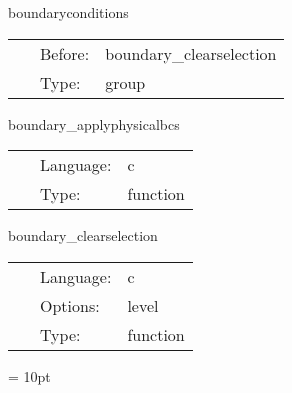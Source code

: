 \documentclass{article}
\begin{document}
\vspace{5mm}


\hspace{5mm} boundaryconditions 

\hspace{5mm}{\it execute all boundary conditions } 


\hspace{5mm}

 \begin{tabular*}{160mm}{cll} 
~ & Before:  & boundary\_clearselection \\ 
~ & Type:  & group \\ 
\end{tabular*} 


\vspace{5mm}


\hspace{5mm} boundary\_applyphysicalbcs 

\hspace{5mm}{\it apply all requested local physical boundary conditions } 


\hspace{5mm}

 \begin{tabular*}{160mm}{cll} 
~ & Language:  & c \\ 
~ & Type:  & function \\ 
\end{tabular*} 


\vspace{5mm}


\hspace{5mm} boundary\_clearselection 

\hspace{5mm}{\it unselect all grid variables for boundary conditions } 


\hspace{5mm}

 \begin{tabular*}{160mm}{cll} 
~ & Language:  & c \\ 
~ & Options:  & level \\ 
~ & Type:  & function \\ 
\end{tabular*} 



\vspace{5mm}\parskip = 10pt 
\end{document}
